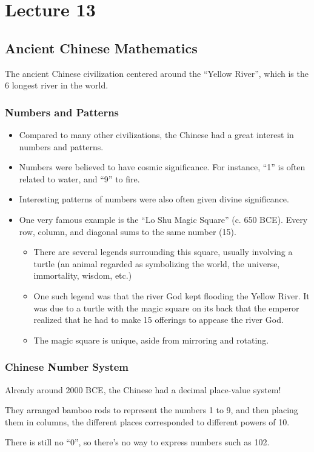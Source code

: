 \documentclass[class=article, crop=false]{standalone}
\begin{document}
  \section{Lecture 13}
  \subsection{Ancient Chinese Mathematics}
  The ancient Chinese civilization centered around the ``Yellow River'', which is the 6 longest river in the world.
  \subsubsection{Numbers and Patterns}
  \begin{itemize}
    \item Compared to many other civilizations, the Chinese had a great interest in numbers and patterns.
    \item Numbers were believed to have cosmic significance. For instance, ``1'' is often related to water, and ``9'' to fire.
    \item Interesting patterns of numbers were also often given divine significance.
    \item One very famous example is the ``Lo Shu Magic Square'' (c. 650 BCE). Every row, column, and diagonal sums to the same number (15).
    \begin{itemize}
      \item There are several legends surrounding this square, usually involving a turtle (an animal regarded as symbolizing the world, the universe, immortality, wisdom, etc.)
      \item One such legend was that the river God kept flooding the Yellow River. It was due to a turtle with the magic square on its back that the emperor realized that he had to make 15 offerings to appease the river God.
      \item The magic square is unique, aside from mirroring and rotating.
    \end{itemize}
  \end{itemize}
  \subsubsection{Chinese Number System}
  Already around 2000 BCE, the Chinese had a decimal place-value system! \par
  They arranged bamboo rods to represent the numbers 1 to 9, and then placing them in columns, the different places corresponded to different powers of 10.
  \begin{note}{}
    There is still no ``0'', so there's no way to express numbers such as 102.
  \end{note}
\end{document}
